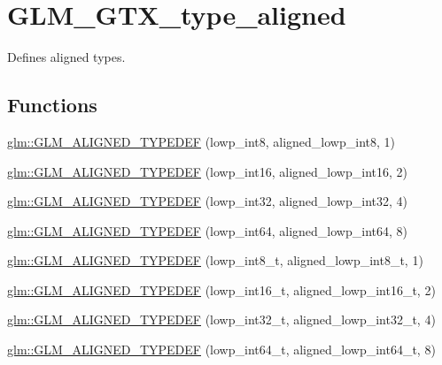\hypertarget{group__gtx__type__aligned}{\section{G\-L\-M\-\_\-\-G\-T\-X\-\_\-type\-\_\-aligned}
\label{group__gtx__type__aligned}
}


Defines aligned types.  


\subsection*{Functions}
\begin{DoxyCompactItemize}
\item 
\hyperlink{group__gtx__type__aligned_gab5cd5c5fad228b25c782084f1cc30114}{glm\-::\-G\-L\-M\-\_\-\-A\-L\-I\-G\-N\-E\-D\-\_\-\-T\-Y\-P\-E\-D\-E\-F} (lowp\-\_\-int8, aligned\-\_\-lowp\-\_\-int8, 1)
\item 
\hyperlink{group__gtx__type__aligned_ga5bb5dd895ef625c1b113f2cf400186b0}{glm\-::\-G\-L\-M\-\_\-\-A\-L\-I\-G\-N\-E\-D\-\_\-\-T\-Y\-P\-E\-D\-E\-F} (lowp\-\_\-int16, aligned\-\_\-lowp\-\_\-int16, 2)
\item 
\hyperlink{group__gtx__type__aligned_gac6efa54cf7c6c86f7158922abdb1a430}{glm\-::\-G\-L\-M\-\_\-\-A\-L\-I\-G\-N\-E\-D\-\_\-\-T\-Y\-P\-E\-D\-E\-F} (lowp\-\_\-int32, aligned\-\_\-lowp\-\_\-int32, 4)
\item 
\hyperlink{group__gtx__type__aligned_ga6612eb77c8607048e7552279a11eeb5f}{glm\-::\-G\-L\-M\-\_\-\-A\-L\-I\-G\-N\-E\-D\-\_\-\-T\-Y\-P\-E\-D\-E\-F} (lowp\-\_\-int64, aligned\-\_\-lowp\-\_\-int64, 8)
\item 
\hyperlink{group__gtx__type__aligned_ga7ddc1848ff2223026db8968ce0c97497}{glm\-::\-G\-L\-M\-\_\-\-A\-L\-I\-G\-N\-E\-D\-\_\-\-T\-Y\-P\-E\-D\-E\-F} (lowp\-\_\-int8\-\_\-t, aligned\-\_\-lowp\-\_\-int8\-\_\-t, 1)
\item 
\hyperlink{group__gtx__type__aligned_ga22240dd9458b0f8c11fbcc4f48714f68}{glm\-::\-G\-L\-M\-\_\-\-A\-L\-I\-G\-N\-E\-D\-\_\-\-T\-Y\-P\-E\-D\-E\-F} (lowp\-\_\-int16\-\_\-t, aligned\-\_\-lowp\-\_\-int16\-\_\-t, 2)
\item 
\hyperlink{group__gtx__type__aligned_ga8130ea381d76a2cc34a93ccbb6cf487d}{glm\-::\-G\-L\-M\-\_\-\-A\-L\-I\-G\-N\-E\-D\-\_\-\-T\-Y\-P\-E\-D\-E\-F} (lowp\-\_\-int32\-\_\-t, aligned\-\_\-lowp\-\_\-int32\-\_\-t, 4)
\item 
\hyperlink{group__gtx__type__aligned_ga7ccb60f3215d293fd62b33b31ed0e7be}{glm\-::\-G\-L\-M\-\_\-\-A\-L\-I\-G\-N\-E\-D\-\_\-\-T\-Y\-P\-E\-D\-E\-F} (lowp\-\_\-int64\-\_\-t, aligned\-\_\-lowp\-\_\-int64\-\_\-t, 8)

\end{DoxyCompactItemize}
